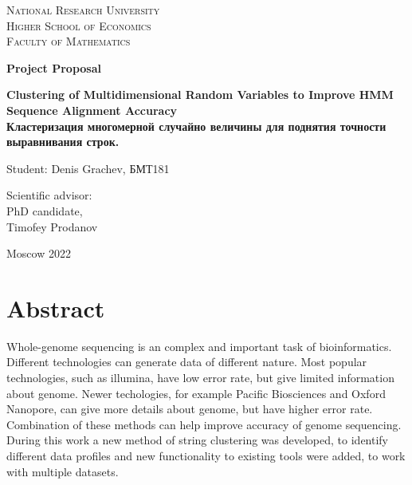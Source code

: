 \documentclass[a4paper, 12pt]{article}
\theoremstyle{definition}
\theoremstyle{definition}
\theoremstyle{remark}
\begin{document}
\begin{center}
{\scshape National Research University\\
Higher School of Economics\\[1ex]
Faculty of Mathematics\par}

\par\vfill

\textbf{\large Project Proposal}

\vspace{1.5cm}

{\Large\bfseries
Clustering of Multidimensional Random Variables to Improve HMM Sequence Alignment Accuracy \\

Кластеризация многомерной случайно величины для поднятия точности выравнивания строк.
\par}

\vspace{1.5cm}

\par\vfill
\noindent\hspace{0.52\textwidth}\parbox[t]{0.48\textwidth}{%
Student: Denis Grachev, БМТ181\\[2ex]
}

\par\vfill
\noindent\hspace{0.52\textwidth}\parbox[t]{0.48\textwidth}{%
Scientific advisor:\\[3pt]
PhD candidate, \\ 
Timofey Prodanov\\[2ex]
}

\par\vfill\vfill
Moscow 2022
\end{center}
\thispagestyle{empty}
\pagebreak


\tableofcontents
\newpage

\section{Abstract}

Whole-genome sequencing is an complex and important task of bioinformatics. 
Different technologies can generate data of different nature. 
Most popular technologies, such as illumina, 
have low error rate, but give limited information about genome.
Newer techologies, for example Pacific Biosciences and Oxford Nanopore, 
can give more details about genome, but have higher error rate. 
Combination of these methods can help improve accuracy of genome sequencing. 
During this work a new method of string clustering was developed, 
to identify different data profiles and new functionality to existing tools were added,
to work with multiple datasets. 
\end{document}
